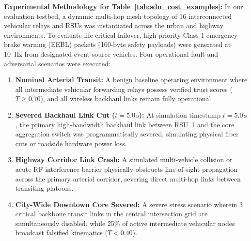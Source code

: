 \documentclass[conference]{IEEEtran}
\begin{document}
\textbf{Experimental Methodology for Table~\ref{tab:sdn_cost_examples}:} In our evaluation testbed, a dynamic multi-hop mesh topology of 16 interconnected vehicular relays and RSUs was instantiated across the urban and highway environments. To evaluate life-critical failover, high-priority Class-1 emergency brake warning (EEBL) packets (100-byte safety payloads) were generated at 10~Hz from designated event source vehicles. Four operational fault and adversarial scenarios were executed:
\begin{enumerate}
    \item \textbf{Nominal Arterial Transit:} A benign baseline operating environment where all intermediate vehicular forwarding relays possess verified trust scores ($T \ge 0.70$), and all wireless backhaul links remain fully operational.
    \item \textbf{Severed Backhaul Link Cut ($t = 5.0\,\text{s}$):} At simulation timestamp $t = 5.0\,\text{s}$, the primary high-bandwidth backhaul link between RSU~1 and the core aggregation switch was programmatically severed, simulating physical fiber cuts or roadside hardware power loss.
    \item \textbf{Highway Corridor Link Crash:} A simulated multi-vehicle collision or acute RF interference barrier physically obstructs line-of-sight propagation across the primary arterial corridor, severing direct multi-hop links between transiting platoons.
    \item \textbf{City-Wide Downtown Core Severed:} A severe stress scenario wherein 3 critical backbone transit links in the central intersection grid are simultaneously disabled, while 25\% of active intermediate vehicular nodes broadcast falsified kinematics ($T < 0.40$).
\end{enumerate}
\end{document}
